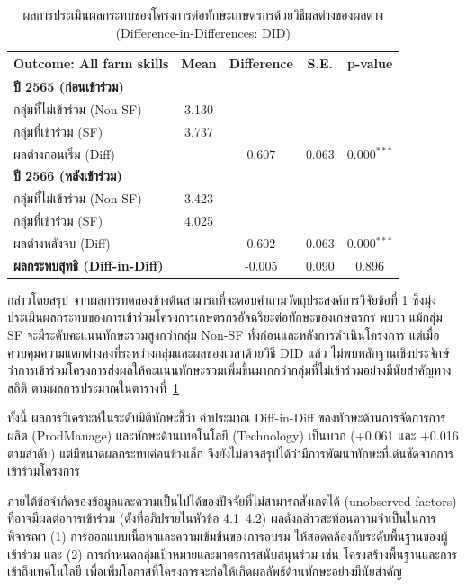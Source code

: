\begin{table}[ht]
\centering
\small
\setlength{\tabcolsep}{4pt}
\renewcommand{\arraystretch}{1.1}

\caption{ผลการประเมินผลกระทบของโครงการต่อทักษะเกษตรกรด้วยวิธีผลต่างของผลต่าง (Difference-in-Differences: DID)}
\label{tab:did}

\begin{tabular}{lcccc}
\hline
\textbf{Outcome: All farm skills} & \textbf{Mean} & \textbf{Difference} & \textbf{S.E.} & \textbf{p-value} \\
\hline

\multicolumn{5}{l}{\textbf{ปี 2565 (ก่อนเข้าร่วม)}} \\
กลุ่มที่ไม่เข้าร่วม (Non-SF) & 3.130 & & & \\
กลุ่มที่เข้าร่วม (SF) & 3.737 & & & \\
ผลต่างก่อนเริ่ม (Diff) & & 0.607 & 0.063 & 0.000$^{***}$ \\

\multicolumn{5}{l}{\textbf{ปี 2566 (หลังเข้าร่วม)}} \\
กลุ่มที่ไม่เข้าร่วม (Non-SF) & 3.423 & & & \\
กลุ่มที่เข้าร่วม (SF) & 4.025 & & & \\
ผลต่างหลังจบ (Diff) & & 0.602 & 0.063 & 0.000$^{***}$ \\

\textbf{ผลกระทบสุทธิ (Diff-in-Diff)} & & -0.005 & 0.090 & 0.896 \\

\hline
\end{tabular}
\end{table}

กล่าวโดยสรุป จากผลการทดลองข้างต้นสามารถที่จะตอบคำถามวัตถุประสงค์การวิจัยข้อที่ 1 ซึ่งมุ่งประเมินผลกระทบของการเข้าร่วมโครงการเกษตรกรอัจฉริยะต่อทักษะของเกษตรกร 
พบว่า แม้กลุ่ม SF จะมีระดับคะแนนทักษะรวมสูงกว่ากลุ่ม Non-SF ทั้งก่อนและหลังการดำเนินโครงการ แต่เมื่อควบคุมความแตกต่างคงที่ระหว่างกลุ่มและผลของเวลาด้วยวิธี DID แล้ว 
ไม่พบหลักฐานเชิงประจักษ์ว่าการเข้าร่วมโครงการส่งผลให้คะแนนทักษะรวมเพิ่มขึ้นมากกว่ากลุ่มที่ไม่เข้าร่วมอย่างมีนัยสำคัญทางสถิติ ตามผลการประมาณในตารางที่~\ref{tab:did}

ทั้งนี้ ผลการวิเคราะห์ในระดับมิติทักษะชี้ว่า ค่าประมาณ Diff-in-Diff ของทักษะด้านการจัดการการผลิต (ProdManage) และทักษะด้านเทคโนโลยี (Technology) เป็นบวก
 (+0.061 และ +0.016 ตามลำดับ) แต่มีขนาดผลกระทบค่อนข้างเล็ก จึงยังไม่อาจสรุปได้ว่ามีการพัฒนาทักษะที่เด่นชัดจากการเข้าร่วมโครงการ

ภายใต้ข้อจำกัดของข้อมูลและความเป็นไปได้ของปัจจัยที่ไม่สามารถสังเกตได้ (unobserved factors) ที่อาจมีผลต่อการเข้าร่วม 
(ดังที่อภิปรายในหัวข้อ 4.1--4.2) ผลดังกล่าวสะท้อนความจำเป็นในการพิจารณา (1) การออกแบบเนื้อหาและความเข้มข้นของการอบรม
ให้สอดคล้องกับระดับพื้นฐานของผู้เข้าร่วม และ (2) การกำหนดกลุ่มเป้าหมายและมาตรการสนับสนุนร่วม เช่น โครงสร้างพื้นฐานและการเข้าถึงเทคโนโลยี เพื่อเพิ่มโอกาสที่โครงการจะก่อให้เกิดผลลัพธ์ด้านทักษะอย่างมีนัยสำคัญ

